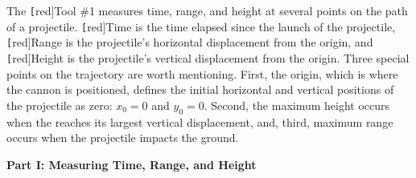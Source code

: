 \documentclass[dvipsnames]{article}
\begin{document}
The \texttt[red]{Tool \#1} measures time, range, and height at several points on the path of a projectile. \texttt[red]{Time} is the time elapsed since the launch of the projectile, \texttt[red]{Range} is the projectile's horizontal displacement from the origin, and \texttt[red]{Height} is the projectile's vertical displacement from the origin. Three special points on the trajectory are worth mentioning. First, the origin, which is where the cannon is positioned, defines the initial horizontal and vertical positions of the projectile as zero: $x_0=0$ and $y_0 = 0$. Second, the maximum height occurs when the reaches its largest vertical displacement, and, third, maximum range occurs when the projectile impacts the ground. 

\begin{center}
\end{center}

\vspace{1em}

\textbf{Part I: Measuring Time, Range, and Height}
\end{document}
